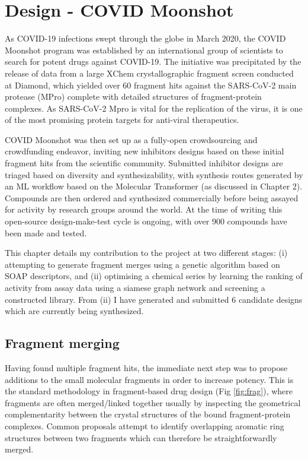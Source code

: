 
\chapter{Design - COVID Moonshot}
As COVID-19 infections swept through the globe in March 2020, the COVID Moonshot program was established by an international group of scientists to search for potent drugs against COVID-19. The initiative was precipitated by the release of data from a large XChem crystallographic fragment screen conducted at Diamond, which yielded over 60 fragment hits against the SARS-CoV-2 main protease (MPro) complete with detailed structures of fragment-protein complexes. As SARS-CoV-2 Mpro is vital for the replication of the virus, it is one of the most promising protein targets for anti-viral therapeutics. 

COVID Moonshot was then set up as a fully-open crowdsourcing and crowdfunding endeavor, inviting new inhibitors designs based on these initial fragment hits from the scientific community. Submitted inhibitor designs are triaged based on diversity and synthesizability, with synthesis routes generated by an ML workflow based on the Molecular Transformer (as discussed in Chapter 2). Compounds are then ordered and synthesized commercially before being assayed for activity by research groups around the world. At the time of writing this open-source design-make-test cycle is ongoing, with over 900 compounds have been made and tested.

This chapter details my contribution to the project at two different stages: (i) attempting to generate fragment merges using a genetic algorithm based on SOAP descriptors, and (ii) optimising a chemical series by learning the ranking of activity from assay data using a siamese graph network and screening a constructed library. From (ii) I have generated and submitted 6 candidate designs which are currently being synthesized.

\section{Fragment merging}
Having found multiple fragment hits, the immediate next step was to propose additions to the small molecular fragments in order to increase potency. This is the standard methodology in fragment-based drug design (Fig \ref{fig:frag}), where fragments are often merged/linked together usually by inspecting the geometrical complementarity between the crystal structures of the bound fragment-protein complexes. Common proposals attempt to identify overlapping aromatic ring structures between two fragments which can therefore be straightforwardly merged.

